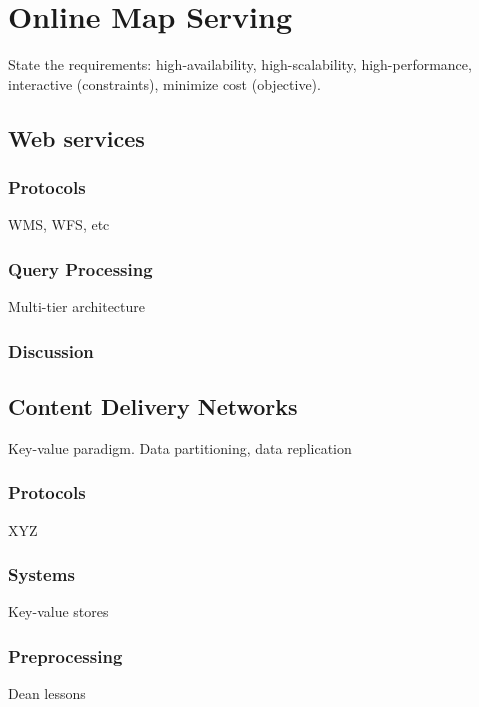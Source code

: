 \documentclass[11pt, oneside]{report}
\begin{document}
{%


\chapter{Online Map Serving}


State the requirements: high-availability, high-scalability, high-performance, interactive (constraints), minimize cost (objective).

\section{Web services}

\subsection{Protocols}
WMS, WFS, etc

\subsection{Query Processing}
Multi-tier architecture

\subsection{Discussion}

\section{Content Delivery Networks}
Key-value paradigm. Data partitioning, data replication

\subsection{Protocols}
XYZ

\subsection{Systems}
Key-value stores

\subsection{Preprocessing}
Dean lessons

}
\end{document}
